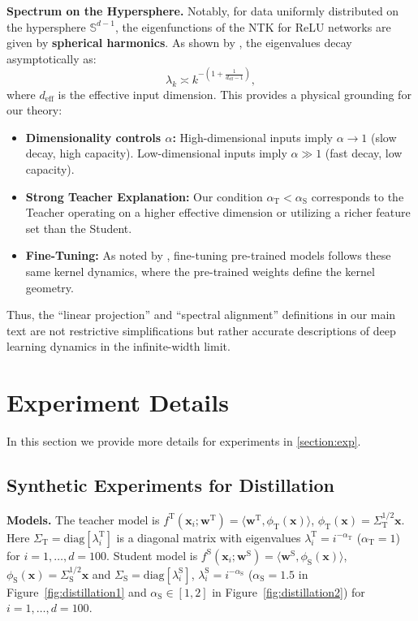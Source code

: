 \documentclass{article}
\theoremstyle{definition}
\theoremstyle{definition}
\theoremstyle{plain}
\theoremstyle{plain}
\theoremstyle{plain}
\theoremstyle{plain}
\theoremstyle{plain}
\newcommand{\te}{\mathrm{T}}
\newcommand{\st}{\mathrm{S}}
\begin{document}
\textbf{Spectrum on the Hypersphere.} 
Notably, for data uniformly distributed on the hypersphere $\mathbb{S}^{d-1}$, the eigenfunctions of the NTK for ReLU networks are given by \textbf{spherical harmonics}. As shown by \citet{bietti2019inductive}, the eigenvalues decay asymptotically as:
\begin{equation}
    \lambda_k \asymp k^{-\left(1 + \frac{1}{d_{\text{eff}}-1}\right)},
\end{equation}
where $d_{\text{eff}}$ is the effective input dimension. This provides a physical grounding for our theory:
\begin{itemize}
    \item \textbf{Dimensionality controls $\alpha$:} High-dimensional inputs imply $\alpha \to 1$ (slow decay, high capacity). Low-dimensional inputs imply $\alpha \gg 1$ (fast decay, low capacity).
    \item \textbf{Strong Teacher Explanation:} Our condition $\alpha_\te < \alpha_\st$ corresponds to the Teacher operating on a higher effective dimension or utilizing a richer feature set than the Student.
    \item \textbf{Fine-Tuning:} As noted by \citet{malladi2023kernelbasedviewlanguagemodel}, fine-tuning pre-trained models follows these same kernel dynamics, where the pre-trained weights define the kernel geometry.
\end{itemize}

Thus, the ``linear projection'' and ``spectral alignment'' definitions in our main text are not restrictive simplifications but rather accurate descriptions of deep learning dynamics in the infinite-width limit.

\section{Experiment Details}
In this section we provide more details for experiments in \ref{section:exp}.
\label{section:exp_app}
\subsection{Synthetic Experiments for Distillation} \label{subsec: distill_app}


\textbf{Models.} The teacher model is $f^{\mathrm{T}}(\mathbf{x}_i;\mathbf{w}^{\mathrm{T}}) = \langle \mathbf{w}^{\mathrm{T}}, \phi_{\mathrm{T}}(\mathbf{x})\rangle$, $\phi_{\mathrm{T}}(\mathbf{x}) = \Sigma_{\mathrm{T}}^{1/2} \mathbf{x}$. Here $\Sigma_{\mathrm{T}} = \mathrm{diag}[\lambda_i^{\mathrm{T}}]$ is a diagonal matrix with eigenvalues $\lambda_i^{\mathrm{T}} = i^{-\alpha_\mathrm{T}}$ ($\alpha_{\mathrm{T}}=1$) for $i = 1, \dots,d=100.$
Student model is $f^{\mathrm{S}}(\mathbf{x}_i; \mathbf{w}^{\mathrm{S}}) = \langle \mathbf{w}^{\mathrm{S}}, \phi_{\mathrm{S}}(\mathbf{x})\rangle$, $\phi_{\mathrm{S}}(\mathbf{x}) =  \Sigma_\mathrm{S}^{1/2} \mathbf{x}$ and $\Sigma_\mathrm{S} = \mathrm{diag}[\lambda_i^{\mathrm{S}}]$, $\lambda_i^{\mathrm{S}} = i^{-\alpha_{\mathrm{S}}}$ ($\alpha_{\mathrm{S}} = 1.5$ in Figure~\ref{fig:distillation1} and $\alpha_{\mathrm{S}} \in [1,2]$ in Figure~\ref{fig:distillation2}) for $i = 1, \dots,d=100$.
\end{document}
